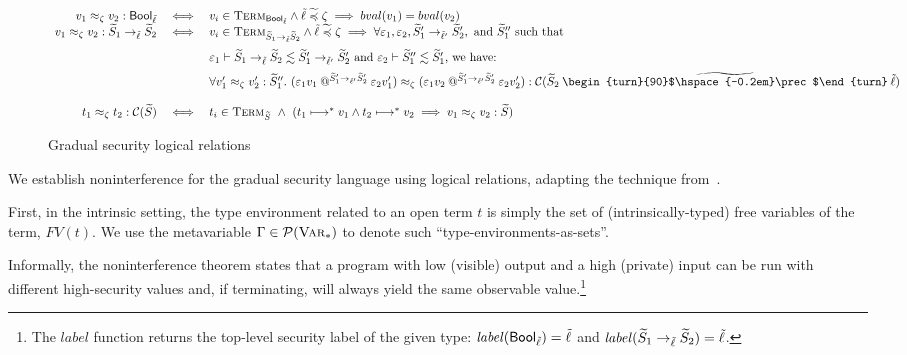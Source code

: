 \documentclass[authoryear,sort&compress,9pt,twocolumn,nocopyrightspace]{sigplanconf}
\makeatletter
\newcommand{\Bool}{\mathsf{Bool}}
\newcommand{\oblset}[1]{\textsc{#1}}
\newcommand{\Var}{\oblset{Var}}
\newcommand{\csub}{\lesssim}
\newcommand{\?}{\textsf{\upshape ?}} \newcommand{\consistent}[1]{\widetilde{#1}}
\newcommand{\ljoincore}{\begin{turn}{90}$\hspace{-0.2em}\prec$\end{turn}}
\newcommand{\cjoin}{\mathbin{\consistent{\ljoincore}}}
\newcommand{\cljoin}{\cjoin}
\newcommand{\slabel}{\mathit{label}}
\newcommand{\TermT}[1]{\oblset{Term}_{#1}}
\newcommand{\red}{\longmapsto}
\newcommand{\iapp}[1]{\mathbin{@^{#1}}}
\newcommand{\ev}{\varepsilon}
\newcommand{\evcast}[2]{#1#2}
\newcommand{\lobs}{\zeta}
\newcommand{\rel}{\approx_{\lobs}}
\newcommand{\rcomp}[1]{\mathcal{C}(#1)}
\newcommand{\bval}[1]{bval(#1)}
\makeatother
\begin{document}
\begin{figure*}[t]
\begin{displaymath}
\begin{array}{rcl}
  v_1 \rel v_2 : \Bool_\clx & \iff & 
  v_i \in \TermT{\Bool_\clx} \land 
  \clx \csubl \lobs \implies \bval{v_1} = \bval{v_2}\\
  v_1 \rel v_2 : \cS_1 ->_{\clx} \cS_2 & \iff & 
  v_i \in \TermT{\cS_1 ->_{\clx} \cS_2} \land \clx \csubl \lobs \implies
  \forall \ev_1, \ev_2, \cS'_1 ->_{\clx'} \cS'_2, \text{ and }\cS''_1
                                                \text{ such that}~\\[0.8em]
& & 
\ev_1 |-  \cS_1 ->_{\clx} \cS_2 \csub \cS'_1 ->_{\clx'} \cS'_2
    \text{ and } \ev_2 |- \cS''_1 \csub \cS'_1 \text{, we have: }\\[0.5em]
& & \forall v'_1 \rel v'_2 : \cS''_1.~
(\evcast{\ev_1}{v_1} \iapp{\cS'_1 ->_{\clx'} \cS'_2} \evcast{\ev_2}{v'_1}) \rel 
(\evcast{\ev_1}{v_2} \iapp{\cS'_1 ->_{\clx'} \cS'_2} \evcast{\ev_2}{v'_2}) : \rcomp{\cS_2 \cljoin \clx}\\
& & \\
t_1 \rel t_2 : \rcomp{\cS} & \iff & t_i \in
                                        \TermT{\cS}~
                                        \wedge~(t_1 \red^{*} v_1
                                        \wedge t_2 \red^{*} v_2 \implies v_1
                                        \rel v_2 : \cS) 
\end{array}
\end{displaymath}
\caption{Gradual security logical relations}
\label{fig:rels}
\end{figure*}

We establish noninterference for the gradual security language using
logical relations, adapting the technique from~\citet{zdancewic}. 

First, in the intrinsic
setting, the type environment related to an open term $t$ is simply the
set of (intrinsically-typed) free variables of the term, $FV(t)$. We
use the metavariable $\Gamma \in \Pow(\Var_{*})$ to denote such
``type-environments-as-sets''. 

Informally, the noninterference theorem states that a program with
low (visible) output and a high (private) input can be run with
different high-security values and, if terminating, will always yield
the same observable value.\footnote{The $\slabel$ function returns the
top-level security label of the given type:
$\slabel(\Bool_\clx) = \clx$ and $\slabel(\cS_1 ->_\clx \cS_2) = \clx$.} 
\end{document}
